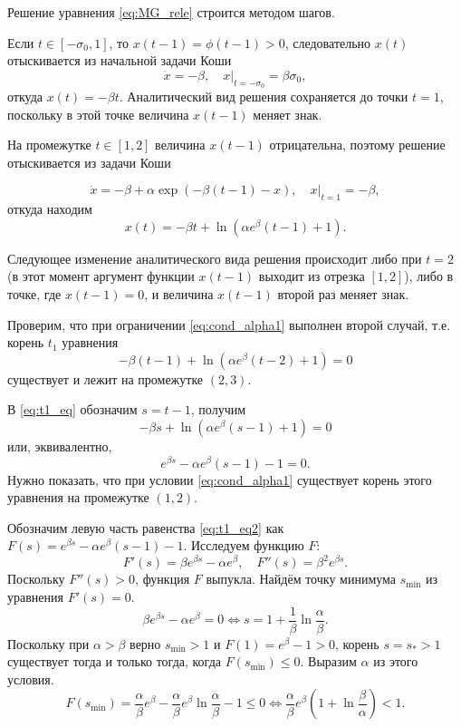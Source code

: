 Решение уравнения \eqref{eq:MG_rele} строится методом шагов.

Если $t \in [-\sigma_0, 1]$, то $x(t - 1) = \phi(t - 1) > 0$, следовательно $x(t)$ отыскивается из начальной задачи Коши
\begin{equation}
    \dot{x} = -\beta, \quad x|_{t = -\sigma_0} = \beta \sigma_0,
\end{equation}
откуда $x(t) = -\beta t$. Аналитический вид решения сохраняется до точки $t = 1$, поскольку в этой точке величина $x(t - 1)$ меняет знак.

На промежутке $t \in [1, 2]$ величина $x(t - 1)$ отрицательна, поэтому решение отыскивается из задачи Коши

\begin{equation}
    \dot{x} = -\beta + \alpha\exp(-\beta(t - 1) - x), \quad x|_{t = 1} = -\beta,
\end{equation}
откуда находим
\begin{equation}
    x(t) = -\beta t +\ln(\alpha e^{\beta}(t - 1) + 1).
\end{equation}

Следующее изменение аналитического вида решения происходит либо при $t = 2$ (в этот момент аргумент функции $x(t - 1)$ выходит из отрезка $[1, 2]$), либо в точке, где $x(t - 1) = 0$, и величина $x(t - 1)$ второй раз меняет знак.

Проверим, что при ограничении \eqref{eq:cond_alpha1} выполнен второй случай, т.е. корень $t_1$ уравнения
\begin{equation}
\label{eq:t1_eq}
    -\beta (t - 1) + \ln(\alpha e^{\beta}(t - 2) + 1) = 0
\end{equation}
существует и лежит на промежутке $(2, 3)$.

В \eqref{eq:t1_eq} обозначим $s = t - 1$, получим
%
$$-\beta s + \ln(\alpha e^{\beta} (s - 1) + 1) = 0$$
%
или, эквивалентно,
%
\begin{equation}
\label{eq:t1_eq2}
e^{\beta s} - \alpha e^{\beta} (s - 1) - 1 = 0.
\end{equation}
Нужно показать, что при условии \eqref{eq:cond_alpha1} существует корень этого уравнения на промежутке $(1, 2)$.

Обозначим левую часть равенства \eqref{eq:t1_eq2} как $F(s) = e^{\beta s} - \alpha e^{\beta} (s - 1) - 1$. Исследуем функцию $F$:
%
\[
F'(s) = \beta e^{\beta s} - \alpha e^{\beta}, \quad F''(s) = \beta^2 e^{\beta s}.
\]
%
Поскольку $F''(s) > 0$, функция $F$ выпукла. Найдём точку минимума $s_{\min}$ из уравнения $F'(s) = 0$.
\[
\beta e^{\beta s} - \alpha e^{\beta} = 0 \Leftrightarrow s = 1 + \frac{1}{\beta}\ln\frac{\alpha}{\beta}.
\]
%
Поскольку при $\alpha > \beta$ верно $s_{\min} > 1$ и $F(1) = e^{\beta} - 1 > 0$, корень $s = s_* > 1$ существует тогда и только тогда, когда $F(s_{\min}) \leqslant 0$. Выразим $\alpha$ из этого условия.
%
\[
F(s_{\min}) = \frac{\alpha}{\beta}e^{\beta} - \frac{\alpha}{\beta}e^\beta\ln\frac{\alpha}{\beta} - 1 \leq 0 \Leftrightarrow \frac{\alpha}{\beta}e^{\beta}\left(1 + \ln\frac{\beta}{\alpha}\right) < 1.
\]

